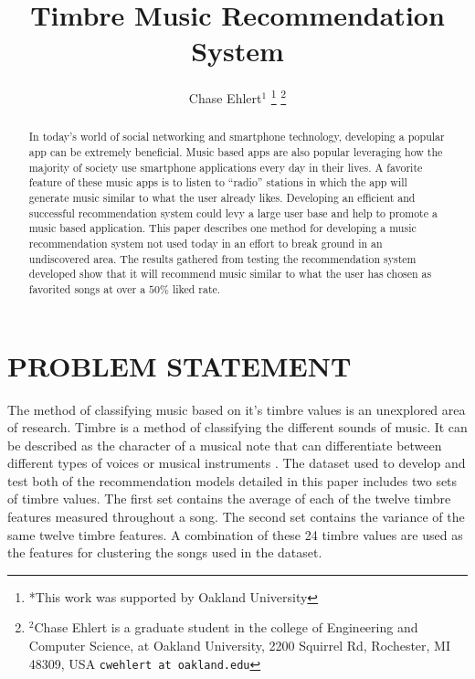 \documentclass[letterpaper, 10 pt, conference]{ieeeconf}
\title{\LARGE \bf
Timbre Music Recommendation System
}
\author{Chase Ehlert$^{1}$%
\thanks{*This work was supported by Oakland University}%
\thanks{$^{2}$Chase Ehlert is a graduate student in the college of Engineering and Computer Science, at Oakland University, 2200 Squirrel Rd, Rochester, MI 48309, USA
        {\tt\small cwehlert at oakland.edu}}%
}
\begin{document}
\maketitle
\thispagestyle{empty}
\pagestyle{empty}


\begin{abstract}
In today’s world of social networking and smartphone technology, developing a popular app can be extremely beneficial. Music based apps are also popular leveraging how the majority of society use smartphone applications every day in their lives. A favorite feature of these music apps is to listen to “radio” stations in which the app will generate music similar to what the user already likes. Developing an efficient and successful recommendation system could levy a large user base and help to promote a music based application. This paper describes one method for developing a music recommendation system not used today in an effort to break ground in an undiscovered area. The results gathered from testing the recommendation system developed show that it will recommend music similar to what the user has chosen as favorited songs at over a $50\%$ liked rate.

\end{abstract}


\section{PROBLEM STATEMENT}
The method of classifying music based on it’s timbre values is an unexplored area of research. Timbre is a method of classifying the different sounds of music. It can be described as the character of a musical note that can differentiate between different types of voices or musical instruments \cite{one}. The dataset used to develop and test both of the recommendation models detailed in this paper includes two sets of timbre values. The first set contains the average of each of the twelve timbre features measured throughout a song. The second set contains the variance of the same twelve timbre features. A combination of these 24 timbre values are used as the features for clustering the songs used in the dataset.

\end{document}
